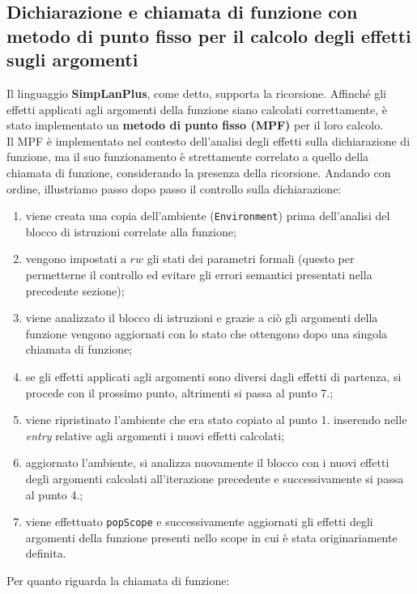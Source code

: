 \documentclass[../report.tex]{subfiles}
\begin{document}
\subsection{Dichiarazione e chiamata di funzione con metodo di punto fisso per il calcolo degli effetti sugli argomenti}\label{s:dichiarazione-chiamata-funzione-mpf}
Il linguaggio \textbf{SimpLanPlus}, come detto, supporta la ricorsione. Affinché gli effetti applicati agli argomenti della funzione siano calcolati correttamente, è stato implementato un \textbf{metodo di punto fisso (MPF)} per il loro calcolo.\\
\noindent
Il MPF è implementato nel contesto dell'analisi degli effetti sulla dichiarazione di funzione, ma il suo funzionamento è strettamente correlato a quello della chiamata di funzione, considerando la presenza della ricorsione.
Andando con ordine, illustriamo passo dopo passo il controllo sulla dichiarazione:
\begin{enumerate}
    \item viene creata una copia dell'ambiente (\verb|Environment|) prima dell'analisi del blocco di istruzioni correlate alla funzione;
    \item vengono impostati a $rw$ gli stati dei parametri formali (questo per permetterne il controllo ed evitare gli errori semantici presentati nella precedente sezione);
    \item viene analizzato il blocco di istruzioni e grazie a ciò gli argomenti della funzione vengono aggiornati con lo stato che ottengono dopo una singola chiamata di funzione;
    \item se gli effetti applicati agli argomenti sono diversi dagli effetti di partenza, si procede con il prossimo punto, altrimenti si passa al punto 7.;
    \item viene ripristinato l'ambiente che era stato copiato al punto 1. inserendo nelle \textit{entry} relative agli argomenti i nuovi effetti calcolati;
    \item aggiornato l'ambiente, si analizza nuovamente il blocco con i nuovi effetti degli argomenti calcolati all'iterazione precedente e successivamente si passa al punto 4.;
    \item viene effettuato \verb|popScope| e successivamente aggiornati gli effetti degli argomenti della funzione presenti nello scope in cui è stata originariamente definita.
\end{enumerate}
Per quanto riguarda la chiamata di funzione:
\end{document}
